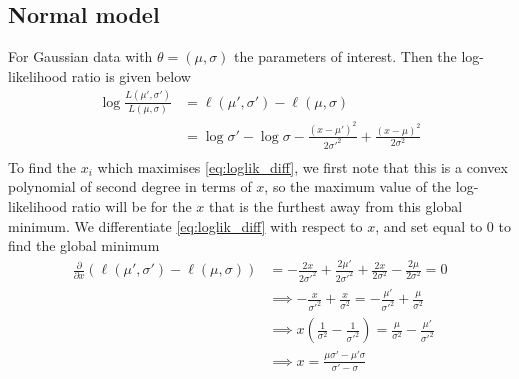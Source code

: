 \subsection{Normal model}
For Gaussian data with $\theta = \left(\mu, \sigma\right)$ the parameters of interest. Then the log-likelihood ratio is given below
\begin{equation}\label{eq:loglik_diff}
\begin{split}
    \log \frac{L\left(\mu', \sigma'\right)}{L\left(\mu, \sigma\right)} &= \ell\left(\mu', \sigma'\right) - \ell\left(\mu, \sigma\right) \\
    & = \log \sigma' - \log \sigma - \frac{\left(x - \mu'\right)^2}{2\sigma'^2} + \frac{\left(x - \mu\right)^2}{2\sigma^2} \\
\end{split}
\end{equation}{}
To find the $x_i$ which maximises \eqref{eq:loglik_diff}, we first note that this is a convex polynomial of second degree in terms of $x$, so the maximum value of the log-likelihood ratio will be for the $x$ that is the  furthest away from this global minimum.
We differentiate \eqref{eq:loglik_diff} with respect to $x$, and set equal to $0$ to find the global minimum 
\begin{equation}
\begin{split}
    \frac{\partial}{\partial x} \left(\ell\left(\mu', \sigma'\right) - \ell\left(\mu, \sigma\right)\right) &=  -\frac{2x}{2\sigma'^2} + \frac{2\mu'}{2\sigma'^2} + \frac{2x}{2\sigma^2} - \frac{2\mu}{2\sigma^2} = 0 \\
    &\implies -\frac{x}{\sigma'^2} + \frac{x}{\sigma^2} = -\frac{\mu'}{\sigma'^2} + \frac{\mu}{\sigma^2} \\
    &\implies x \left(\frac{1}{\sigma^2} - \frac{1}{\sigma'^2}\right) = \frac{\mu}{\sigma^2} - \frac{\mu'}{\sigma'^2} \\
    &\implies x =  \frac{\mu\sigma' - \mu'\sigma}{\sigma' - \sigma}
\end{split}
\end{equation}

